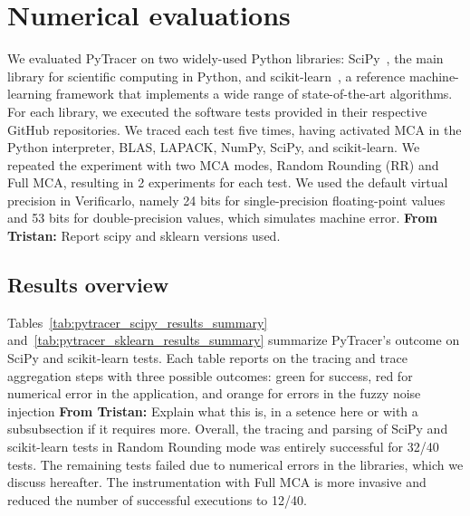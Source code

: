 \documentclass[11pt]{article}
\newcommand{\tristan}[1]{\color{orange}\textbf{From Tristan:} #1\color{black}\xspace}
\newcommand{\pytracer}[0]{PyTracer\xspace}
\begin{document}
\section{Numerical evaluations}

We evaluated \pytracer on two widely-used Python libraries: SciPy~\cite{virtanen2020scipy}, the main library for scientific computing in Python, and  scikit-learn~\cite{pedregosa2011scikit}, a reference machine-learning framework that
 implements a wide range of state-of-the-art algorithms. For each library, we executed the software tests provided in their respective GitHub repositories. We traced each test five times, having activated MCA in the Python interpreter, BLAS, LAPACK, NumPy, SciPy, and scikit-learn. We repeated the experiment with two MCA modes, Random Rounding (RR) and Full MCA, resulting in 2 experiments for each test. We used the default virtual precision in Verificarlo, namely 24 bits for single-precision floating-point values and 53 bits for double-precision values, which simulates machine error. \tristan{Report scipy and sklearn versions used.}

\subsection{Results overview}

Tables~\ref{tab:pytracer_scipy_results_summary} and~\ref{tab:pytracer_sklearn_results_summary} summarize 
\pytracer's outcome on SciPy and scikit-learn tests.
Each table reports on the tracing and trace aggregation steps with three possible outcomes: green for success, red for numerical error in the application, and orange for errors in the fuzzy noise injection \tristan{Explain what this is, in a setence here or with a subsubsection if it requires more}. Overall, the tracing and parsing of SciPy and scikit-learn tests in Random Rounding mode was entirely successful for 32/40 tests. The remaining tests failed due to numerical errors in the libraries, which we discuss hereafter. The instrumentation with Full MCA is more invasive and reduced the number of successful executions to 12/40.
\end{document}
